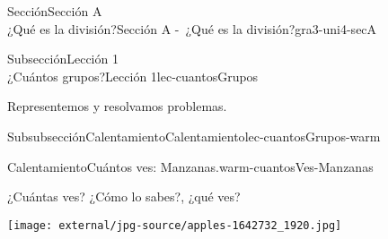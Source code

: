\clearpage
\setcounter{tocdepth}{2}
\renewcommand{\contentsname}{Tabla de contenido}
\tableofcontents
%
%
\typeout{************************************************}
\typeout{************************************************}
%
\begin{sectionptx}{Sección}{{\Large Sección A\\}¿Qué es la división?}{}{Sección A -~¿Qué es la división?}{}{}{gra3-uni4-secA}
%
%
\typeout{************************************************}
\typeout{************************************************}
%
\begin{subsectionptx}{Subsección}{{\normalsize Lección 1\\[-0.05cm]}¿Cuántos grupos?}{}{Lección 1}{}{}{lec-cuantosGrupos}
\begin{introduction}{}%
Representemos y resolvamos problemas.%
\end{introduction}%
%
%
\typeout{************************************************}
\typeout{************************************************}
%
\begin{subsubsectionptx}{Subsubsección}{Calentamiento}{}{Calentamiento}{}{}{lec-cuantosGrupos-warm}
\begin{exploration}{Calentamiento}{Cuántos ves: Manzanas.}{warm-cuantosVes-Manzanas}%
\begin{sidebyside}{2}{0}{0}{0.2}%
\begin{sbspanel}{0.5}%
¿Cuántas ves?
 ¿Cómo lo sabes?, ¿qué ves?%
\end{sbspanel}%
\begin{sbspanel}{0.3}%
\begin{image}{0}{1}{0}{}%
\texttt{[image: external/jpg-source/apples-1642732\_1920.jpg]}
\end{image}%
\end{sbspanel}%




\end{sidebyside}
\end{exploration}
\end{subsubsectionptx}
\end{subsectionptx}
\end{sectionptx}
